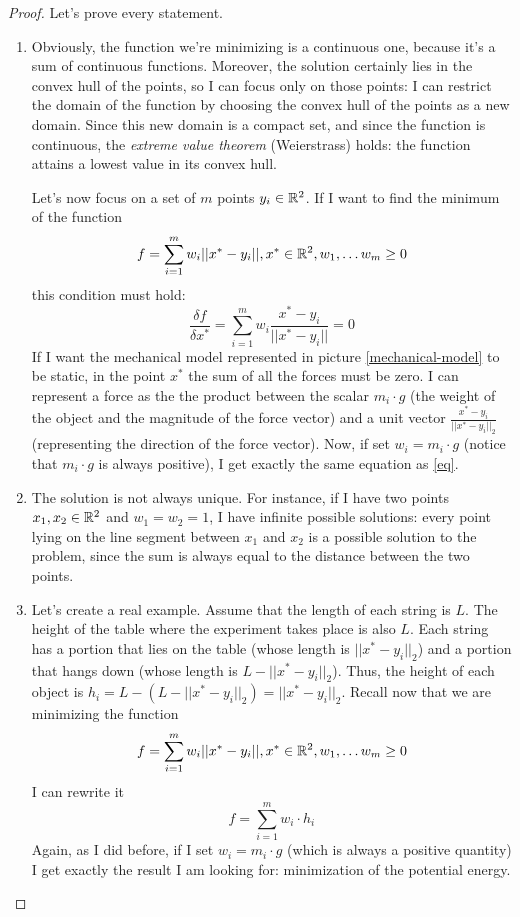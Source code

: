 \begin{proof}
    Let's prove every statement.
    \begin{enumerate}
        \item Obviously, the function we're minimizing is a continuous one, because it's a sum of continuous functions. Moreover, the solution certainly lies in the convex hull of the points, so I can focus only on those points: I can restrict the domain of the function by choosing the convex hull of the points as a new domain. Since this new domain is a compact set, and since the function is continuous, the \emph{extreme value theorem} (Weierstrass) holds: the function attains a lowest value in its convex hull.\par
        Let's now focus on a set of \(m\) points \(y_i \in\mathbb{R}^2\). If I want to find the minimum of the function
        \[f = \sum_{i=1}^{m}w_i||x^*-y_i||, x^*\in\mathbb{R}^2, w_1, \dots w_m \geq 0\]
        this condition must hold:
        \begin{equation}\label{eq}
            \frac{\delta f}{\delta x^*} = \sum_{i=1}^{m}w_i\frac{x^*-y_i}{||x^*-y_i||}=0
        \end{equation}
        If I want the mechanical model represented in picture \ref{mechanical-model} to be static, in the point \(x^*\) the sum of all the forces must be zero. I can represent a force as the the product between the scalar \(m_i\cdot g\) (the weight of the object and the magnitude of the force vector) and a unit vector \(\frac{x^*-y_i}{||x^*-y_i||_2}\) (representing the direction of the force vector). Now, if set \(w_i = m_i\cdot g\) (notice that \(m_i\cdot g\) is always positive), I get exactly the same equation as \eqref{eq}.
        \item The solution is not always unique. For instance, if I have two points \(x_1, x_2 \in \mathbb{R}^2\) and \(w_1 = w_2 = 1\), I have infinite possible solutions: every point lying on the line segment between \(x_1\) and \(x_2\) is a possible solution to the problem, since the sum is always equal to the distance between the two points.
        \item Let's create a real example. Assume that the length of each string is \(L\). The height of the table where the experiment takes place is also \(L\). Each string has a portion that lies on the table (whose length is \(||x^*-y_i||_2\)) and a portion that hangs down (whose length is \(L-||x^*-y_i||_2\)). Thus, the height of each object is \(h_i = L - (L - ||x^*-y_i||_2) = ||x^*-y_i||_2\). Recall now that we are minimizing the function
        \[f = \sum_{i=1}^{m}w_i||x^*-y_i||, x^*\in\mathbb{R}^2, w_1, \dots w_m \geq 0\]
        I can rewrite it
        \[f = \sum_{i=1}^{m}w_i\cdot h_i\]
        Again, as I did before, if I set \(w_i = m_i\cdot g\) (which is always a positive quantity) I get exactly the result I am looking for: minimization of the potential energy.
    \end{enumerate}
\end{proof}